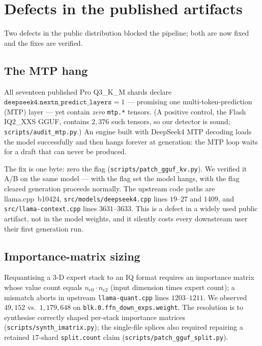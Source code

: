 \documentclass[11pt]{article}
\newcommand{\code}[1]{\texttt{#1}}
\begin{document}
\section{Defects in the published artifacts}
\label{sec:defects}

Two defects in the public distribution blocked the pipeline; both are now fixed
and the fixes are verified.

\subsection{The MTP hang}
\label{sec:mtp}

All seventeen published Pro Q3\_K\_M shards declare
$\code{deepseek4.nextn\_predict\_layers}=1$ --- promising one
multi-token-prediction (MTP) layer --- yet contain \emph{zero} \code{mtp.*}
tensors. (A positive control, the Flash IQ2\_XXS GGUF, contains $2{,}376$ such
tensors, so our detector is sound; \code{scripts/audit\_mtp.py}.) An engine built
with DeepSeek4 MTP decoding loads the model successfully and then hangs forever
at generation: the MTP loop waits for a draft that can never be produced.

The fix is one byte: zero the flag (\code{scripts/patch\_gguf\_kv.py}). We
verified it A/B on the same model --- with the flag set the model hangs, with the
flag cleared generation proceeds normally. The upstream code paths are
llama.cpp~b10424, \code{src/models/deepseek4.cpp} lines $19$--$27$ and $1409$,
and \code{src/llama-context.cpp} lines $3631$--$3633$. This is a defect in a
widely used public artifact, not in the model weights, and it silently costs
every downstream user their first generation run.

\subsection{Importance-matrix sizing}
\label{sec:imatrix}

Requantising a $3$-D expert stack to an IQ format requires an importance matrix
whose value count equals $n_{e0}\cdot n_{e2}$ (input dimension times expert
count); a mismatch aborts in upstream \code{llama-quant.cpp} lines
$1203$--$1211$. We observed $49{,}152$ vs.\ $1{,}179{,}648$ on
\code{blk.0.ffn\_down\_exps.weight}. The resolution is to synthesise correctly
shaped per-stack importance matrices (\code{scripts/synth\_imatrix.py}); the
single-file splices also required repairing a retained $17$-shard
\code{split.count} claim (\code{scripts/patch\_gguf\_split.py}).
\end{document}
